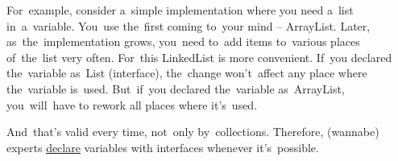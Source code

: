 For~example, consider a~simple implementation where you need a~list in~a~variable.
You~use the~first coming to~your mind -- ArrayList.
Later, as~the~implementation grows, you~need to~add items to~various places of~the~list very often.
For~this LinkedList is more convenient.
If~you declared the~variable as~List (interface), the~change won't~affect any place where the~variable is~used.
But~if~you declared the~variable as~ArrayList, you~will~have to rework all places where it's~used.

And~that's valid every time, not~only by~collections.
Therefore, (wannabe) experts \hyperref[declarationdefinition]{declare} variables with interfaces whenever it's~possible.
